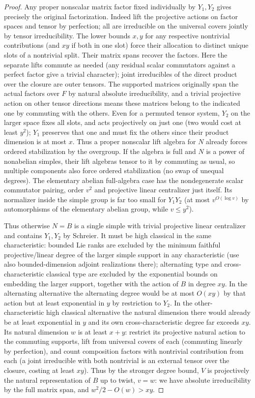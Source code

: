 \begin{proof}
Any proper nonscalar matrix factor fixed individually by \(Y_1,Y_2\) gives precisely the original
factorization. Indeed lift the projective actions on factor spaces and tensor by perfection; all are
irreducible on the universal covers jointly by tensor irreducibility. The lower bounds \(x,y\) for any
respective nontrivial contributions (and \(xy\) if both in one slot) force their allocation to distinct
unique slots of a nontrivial split. Their matrix spans recover the factors. Here the separate lifts
commute as needed (any residual scalar commutators against a perfect factor give a trivial character);
joint irreducibles of the direct product over the closure are outer tensors. The supported matrices
originally span the actual factors over \(F\) by natural absolute irreducibility, and a trivial
projective action on other tensor directions means these matrices belong to the indicated one by
commuting with the others. Even for a permuted tensor system, \(Y_2\) on the larger space fixes all
slots, and acts projectively on just one (two would cost at least \(y^2\)); \(Y_1\) preserves that one
and must fix the others since their product dimension is at most \(x\). Thus a proper nonscalar lift
algebra for \(N\) already forces ordered stabilization by the overgroup. If the algebra is full and \(N\)
is a power of nonabelian simples, their lift algebras tensor to it by commuting as usual, so multiple
components also force ordered stabilization (no swap of unequal degrees). The elementary abelian
full-algebra case has the nondegenerate scalar commutator pairing, order \(v^2\) and projective linear
centralizer just itself. Its normalizer inside the simple group is far too small for \(Y_1Y_2\) (at most
\(v^{O(\log v)}\) by automorphisms of the elementary abelian group, while \(v\le y^2\)).

Thus otherwise \(N=B\) is a single simple with trivial projective linear centralizer and contains
\(Y_1,Y_2\) by Schreier. It must be high classical in the same characteristic: bounded Lie ranks are
excluded by the minimum faithful projective/linear degree of the larger simple support in any
characteristic (use also bounded-dimension adjoint realizations there); alternating type and
cross-characteristic classical type are excluded by the exponential bounds on embedding the larger
support, together with the action of \(B\) in degree \(xy\). In the alternating alternative the
alternating degree would be at most \(O(xy)\) by that action but at least exponential in \(y\) by
restriction to \(Y_2\). In the other-characteristic high classical alternative the natural dimension
there would already be at least exponential in \(y\) and its own cross-characteristic degree far exceeds
\(xy\). Its natural dimension \(w\) is at least \(x+y\): restrict its projective natural action to the
commuting supports, lift from universal covers of each (commuting linearly by perfection), and count
composition factors with nontrivial contribution from each (a joint irreducible with both nontrivial is
an external tensor over the closure, costing at least \(xy\)). Thus by the stronger degree bound, \(V\)
is projectively the natural representation of \(B\) up to twist, \(v=w\): we have absolute irreducibility
by the full matrix span, and \(w^2/2-O(w)>xy\).


\end{proof}
